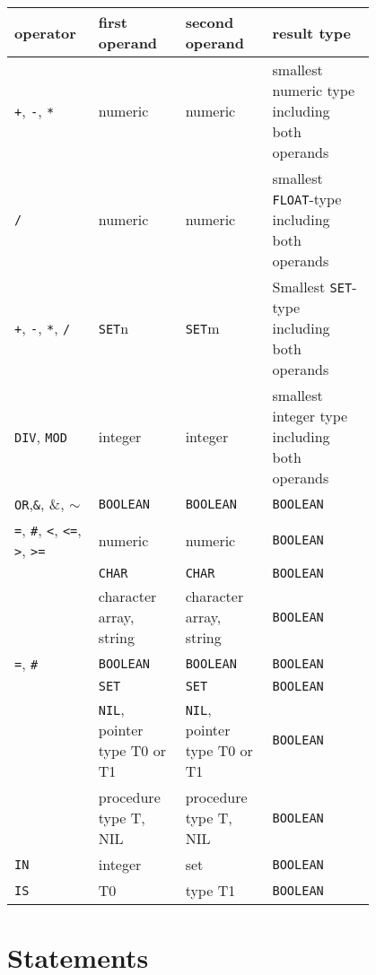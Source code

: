 \documentclass[a4wide,11pt]{article}
\newcommand{\DIV}{\lstinline"DIV"}
\newcommand{\MOD}{\lstinline"MOD"}
\newcommand{\IN}{\lstinline"IN"}
\newcommand{\IS}{\lstinline"IS"}
\newcommand{\NIL}{\lstinline"NIL"}
\newcommand{\CHAR}{\lstinline"CHAR"}
\newcommand{\FLOAT}{\lstinline"FLOAT"}
\newcommand{\BOOLEAN}{\lstinline"BOOLEAN"}
\newcommand{\SET}{\lstinline"SET"}
\begin{document}
\begin{longtable}{p{0.15\linewidth}p{0.2\linewidth}p{0.2\linewidth}p{0.25\linewidth}}
operator & first operand & second operand & result type \\ \hline
\lstinline$+$, \lstinline$-$, \lstinline$*$ &  numeric & numeric & smallest numeric type including both operands\\
\lstinline$/$ & numeric & numeric & smallest \FLOAT-type including both operands\\
\lstinline$+$, \lstinline$-$, \lstinline"*", \lstinline"/" & \SET{n} & \SET{m} & Smallest \SET-type including both operands\\
\DIV, \MOD & integer & integer & smallest integer type including both operands\\
\lstinline"OR",\lstinline"&", \&, $\sim$ & \BOOLEAN & \BOOLEAN & \BOOLEAN\\
\lstinline"=", \lstinline"#", \lstinline"<", \lstinline"<=", \lstinline">", \lstinline">=" & numeric & numeric & \BOOLEAN\\
& \CHAR & \CHAR & \BOOLEAN\\
& character array, string & character array, string& \BOOLEAN\\
\lstinline$=$, \lstinline$#$ & \BOOLEAN & \BOOLEAN & \BOOLEAN\\
& \SET & \SET & \BOOLEAN\\
& \NIL, pointer type T0 or T1 & \NIL, pointer type T0 or T1 & \BOOLEAN \\
& procedure type T, NIL & procedure type T, NIL &  \BOOLEAN\\
\IN & integer & set & \BOOLEAN \\
\IS & T0 & type T1 & \BOOLEAN
\end{longtable}

\section{Statements}
\end{document}
